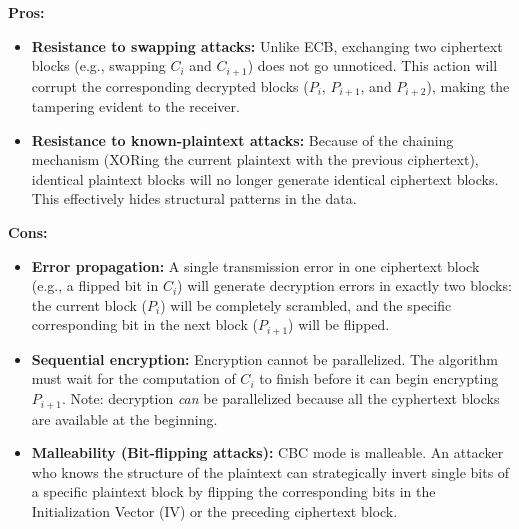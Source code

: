 \textbf{Pros:}
\begin{itemize}
    \item \textbf{Resistance to swapping attacks:} Unlike ECB, exchanging two ciphertext blocks (e.g., swapping $C_i$ and $C_{i+1}$) does not go unnoticed. This action will corrupt the corresponding decrypted blocks ($P_i$, $P_{i+1}$, and $P_{i+2}$), making the tampering evident to the receiver.
    \item \textbf{Resistance to known-plaintext attacks:} Because of the chaining mechanism (XORing the current plaintext with the previous ciphertext), identical plaintext blocks will no longer generate identical ciphertext blocks. This effectively hides structural patterns in the data.
\end{itemize}

\textbf{Cons:}
\begin{itemize}
    \item \textbf{Error propagation:} A single transmission error in one ciphertext block (e.g., a flipped bit in $C_i$) will generate decryption errors in exactly two blocks: the current block ($P_i$) will be completely scrambled, and the specific corresponding bit in the next block ($P_{i+1}$) will be flipped.
    \item \textbf{Sequential encryption:} Encryption cannot be parallelized. The algorithm must wait for the computation of $C_i$ to finish before it can begin encrypting $P_{i+1}$. Note: decryption \textit{can} be parallelized because all the cyphertext blocks are available at the beginning.
    \item \textbf{Malleability (Bit-flipping attacks):} CBC mode is malleable. An attacker who knows the structure of the plaintext can strategically invert single bits of a specific plaintext block by flipping the corresponding bits in the Initialization Vector (IV) or the preceding ciphertext block.
\end{itemize}

